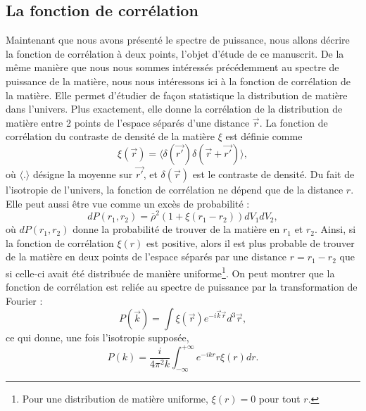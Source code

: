 \documentclass[11pt, twoside, a4paper, openright]{report}
\begin{document}
\subsection{La fonction de corrélation}

Maintenant que nous avons présenté le spectre de puissance, nous allons décrire la fonction de corrélation à deux points, l'objet d'étude de ce manuscrit. De la même manière que nous nous sommes intéressés précédemment au spectre de puissance de la matière, nous nous intéressons ici à la fonction de corrélation de la matière. Elle permet d'étudier de façon statistique la distribution de matière dans l'univers. Plus exactement, elle donne la corrélation de la distribution de matière entre 2 points de l'espace séparés d'une distance $\vec r$. La fonction de corrélation du contraste de densité de la matière $\xi$ est définie comme
\begin{equation}
  \label{eq:def_cf}
  \xi(\vec r) = \langle \delta(\vec{r'}) \delta(\vec{r} + \vec{r'}) \rangle,
\end{equation}
où $\langle.\rangle$ désigne la moyenne sur $\vec{r'}$, et $\delta(\vec{r})$ est le contraste de densité.
Du fait de l'isotropie de l'univers, la fonction de corrélation ne dépend que de la distance $r$.
Elle peut aussi être vue comme un excès de probabilité :
\begin{equation}
  \label{eq:def_cf2}
  dP(r_{1}, r_{2}) = \overline \rho^{2} ( 1 + \xi(r_{1} - r_{2})) dV_{1} dV_{2} ,
\end{equation}
où $dP(r_{1}, r_{2})$ donne la probabilité de trouver de la matière en $r_{1}$ et $r_{2}$.
Ainsi, si la fonction de corrélation $\xi(r)$ est positive, alors il est plus probable de trouver de la matière en deux points de l'espace séparés par une distance $r = r_{1} - r_{2}$ que si celle-ci avait été distribuée de manière uniforme\footnote{Pour une distribution de matière uniforme, $\xi(r) = 0$ pour tout $r$.}.
On peut montrer que la fonction de corrélation est reliée au spectre de puissance par la transformation de Fourier :
\begin{equation}
  \label{eq:cf_tf}
  P(\vec{k}) = \int \xi(\vec{r}) e^{- i \vec{k} \vec{r}} d^3\vec{r} ,
\end{equation}
ce qui donne, une fois l'isotropie supposée,
\begin{equation}
  \label{eq:cf_tf2}
  P(k) = \frac{i}{4 \pi^2 k} \int_{-\infty}^{+\infty} e^{- i k r} r \xi(r) dr .
\end{equation}
\end{document}
